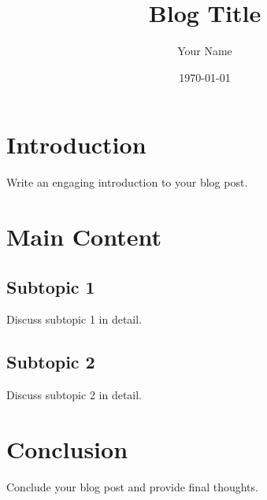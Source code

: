 \documentclass[a4paper,12pt]{article}
\title{Blog Title}
\author{Your Name}
\date{\today}
\begin{document}
\maketitle

\section{Introduction}
Write an engaging introduction to your blog post.

\section{Main Content}
\subsection{Subtopic 1}
Discuss subtopic 1 in detail.

\subsection{Subtopic 2}
Discuss subtopic 2 in detail.

\section{Conclusion}
Conclude your blog post and provide final thoughts.
\end{document}
